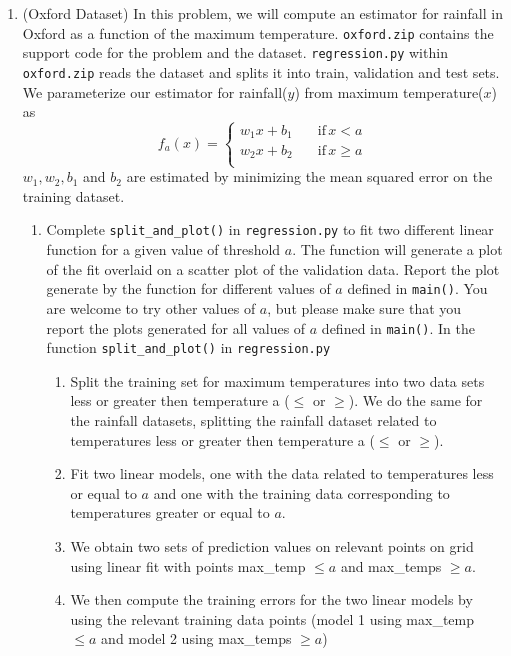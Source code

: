 \documentclass[12pt,twoside]{article}
\begin{document}
\begin{enumerate}
 \item (Oxford Dataset) In this problem, we will compute an estimator for rainfall in Oxford as a function of the maximum temperature. \verb|oxford.zip| contains the support code for the problem and the dataset. \verb|regression.py| within \verb|oxford.zip| reads the dataset and splits it into train, validation and test sets. We parameterize our estimator for rainfall($y$) from maximum temperature($x$) as 
  \begin{equation*}
f_a(x)=\begin{cases}
          w_1x + b_1 \quad &\text{if} \, x< a \\
         w_2x + b_2 &\text{if} \, x \geq a \\
     \end{cases}
 \end{equation*}
 $w_1, w_2, b_1$ and $b_2$ are estimated by minimizing the mean squared error on the training dataset. 
 \begin{enumerate}
 \item Complete \verb|split_and_plot()| in \verb|regression.py| to fit two different linear function for a given value of threshold $a$. The function will generate a plot of the fit overlaid on a scatter plot of the validation data. Report the plot generate by the function for different values of $a$ defined in \verb|main()|. You are welcome to try other values of $a$, but please make sure that you report the plots generated for all values of $a$ defined in \verb|main()|. 
	In the function  \verb|split_and_plot()| in \verb|regression.py|
	\begin{enumerate}[(1)]
		\item Split the training set for maximum temperatures into two data sets less or greater then temperature a ($\le$ or $\ge$). 
		We do the same for the rainfall datasets, splitting the rainfall dataset related to temperatures  less or greater then temperature a  ($\le$ or $\ge$). 
		\item Fit two linear models, one with the data related to temperatures less or equal to $a$ and one with the training data corresponding to temperatures greater or equal to $a$. 
		\item We obtain two sets of prediction values on relevant points on grid using linear fit with points max\_temp $\le a$ and max\_temps $\ge a$.
		\item We then compute the training errors for the two linear models by using the relevant training data points (model 1 using max\_temp $\le a$ and  model 2 using max\_temps $\ge a$)

\end{enumerate}
\end{enumerate}
\end{enumerate}
\end{document}

